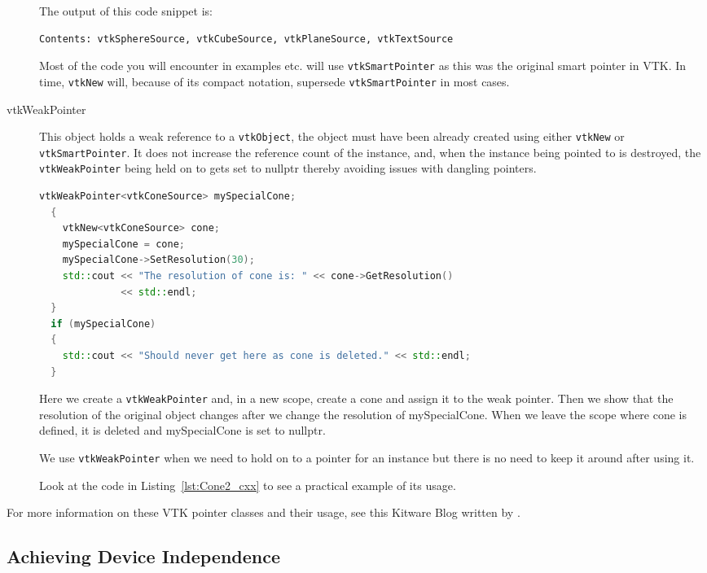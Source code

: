 \begin{description}
The output of this code snippet is:
\begin{lstlisting}
Contents: vtkSphereSource, vtkCubeSource, vtkPlaneSource, vtkTextSource
\end{lstlisting}

Most of the code you will encounter in examples etc. will use \texttt{vtkSmartPointer} as this was the original smart pointer in VTK. In time, \texttt{vtkNew} will, because of its compact notation, supersede \texttt{vtkSmartPointer} in most cases.

\item[vtkWeakPointer] This object holds a weak reference to a \texttt{vtkObject}, the object must have been already created using either \texttt{vtkNew} or \texttt{vtkSmartPointer}. It does not increase the reference count of the instance, and, when the instance being pointed to is destroyed, the \texttt{vtkWeakPointer} being held on to gets set to nullptr thereby avoiding issues with dangling pointers.

\begin{lstlisting}[language=C++]
  vtkWeakPointer<vtkConeSource> mySpecialCone;
  {
    vtkNew<vtkConeSource> cone;
    mySpecialCone = cone;
    mySpecialCone->SetResolution(30);
    std::cout << "The resolution of cone is: " << cone->GetResolution()
              << std::endl;
  }
  if (mySpecialCone)
  {
    std::cout << "Should never get here as cone is deleted." << std::endl;
  }
\end{lstlisting}
Here we create a \texttt{vtkWeakPointer} and, in a new scope, create a cone and assign it to the weak pointer. Then we show that the resolution of the original object changes after we change the resolution of mySpecialCone. When we leave the scope where cone is defined, it is deleted and mySpecialCone is set to nullptr.

We use \texttt{vtkWeakPointer} when we need to hold on to a pointer for an instance but there is no need to keep it around after using it.

Look at the code in Listing~\ref{lst:Cone2_cxx} to see a practical example of its usage.

\end{description}

For more information on these VTK pointer classes and their usage, see this Kitware Blog written by \cite{Hanwell11}.

\subsection{Achieving Device Independence}
\label{sec:adi}

